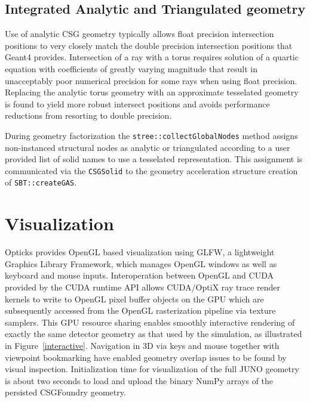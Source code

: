 \documentclass{webofc}
\begin{document}
\subsection{Integrated Analytic and Triangulated geometry}
Use of analytic CSG geometry typically allows float precision intersection 
positions to very closely match the double precision intersection positions 
that Geant4 provides. 
Intersection of a ray with a torus requires solution of a quartic equation
with coefficients of greatly varying magnitude that result in unacceptably 
poor numerical precision for some rays when using float precision. 
Replacing the analytic torus geometry with an approximate
tesselated geometry is found to yield more robust intersect positions
and avoids performance reductions from resorting to double precision.  

During geometry factorization the {\tt stree::collectGlobalNodes} method
assigns non-instanced structural nodes as analytic or
triangulated according to a user provided list of solid names to use 
a tesselated representation. This assignment is communicated via the {\tt CSGSolid}     
to the geometry acceleration structure creation of {\tt SBT::createGAS}. 
%
%
%
%
\section{Visualization}%
%
Opticks provides OpenGL based visualization using GLFW, a lightweight 
Graphics Library Framework, which manages OpenGL windows as well as 
keyboard and mouse inputs. 
Interoperation between OpenGL and CUDA provided by the CUDA runtime API 
allows CUDA/OptiX ray trace render kernels to write to OpenGL 
pixel buffer objects on the GPU which are subsequently accessed from the 
OpenGL rasterization pipeline via texture samplers. This 
GPU resource sharing enables smoothly interactive rendering of 
exactly the same detector geometry as that used by the simulation, as
illustrated in Figure~\ref{interactive}.  
Navigation in 3D via keys and mouse together with viewpoint bookmarking have enabled 
geometry overlap issues to be found by visual inspection.       
Initialization time for visualization of the full JUNO geometry 
is about two seconds to load and upload the binary NumPy arrays of the 
persisted CSGFoundry geometry.   
\end{document}
